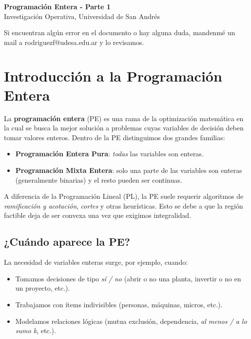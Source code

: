 \documentclass[12pt]{article}
\begin{document}
\begin{center}
  {\LARGE \textbf{Programación Entera - Parte 1}}\\[0.5em]
  {Investigación Operativa, Universidad de San Andrés}
\end{center}

Si encuentran algún error en el documento o hay alguna duda, mandenmé un mail a rodriguezf@udesa.edu.ar y lo revisamos.

\section{Introducción a la Programación Entera}
La \textbf{programación entera} (PE) es una rama de la optimización matemática en la cual se busca la mejor solución a problemas cuyas variables de decisión deben tomar valores enteros. Dentro de la PE distinguimos dos grandes familias:

\begin{itemize}
    \item \textbf{Programación Entera Pura}: \textit{todas} las variables son enteras.
    \item \textbf{Programación Mixta Entera}: solo una parte de las variables son enteras (generalmente binarias) y el resto pueden ser continuas.
\end{itemize}

A diferencia de la Programación Lineal (PL), la PE suele requerir algoritmos de \emph{ramificación y acotación}, \emph{cortes} y otras heurísticas. Esto se debe a que la región factible deja de ser convexa una vez que exigimos integralidad.

\subsection{¿Cuándo aparece la PE?}
La necesidad de variables enteras surge, por ejemplo, cuando:
\begin{itemize}
    \item Tomamos decisiones de tipo \emph{s\'i / no} (abrir o no una planta, invertir o no en un proyecto, etc.).
    \item Trabajamos con ítems indivisibles (personas, máquinas, micros, etc.).
    \item Modelamos relaciones lógicas (mutua exclusión, dependencia, \emph{al menos / a lo sumo k}, etc.).
\end{itemize}
\end{document}
